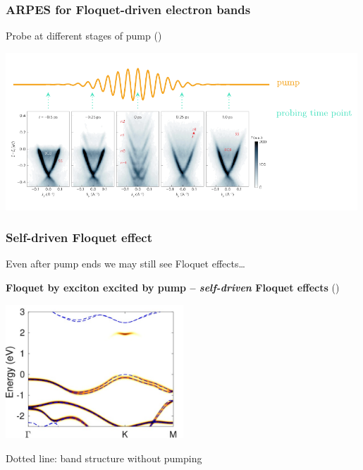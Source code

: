 \documentclass[t]{beamer}
\begin{document}
\begin{frame}
\frametitle{ARPES for Floquet-driven electron bands}

Probe at different stages of pump (\cite{mahmood2016selective})

\begin{center}
    \includegraphics[width=0.99\textwidth]{plot/floquet-pump-relation.pdf}    
\end{center}


\end{frame}

\begin{frame}
\frametitle{Self-driven Floquet effect}

Even after pump ends we may still see Floquet effects\dots

\textbf{Floquet by exciton excited by pump -- \emph{self-driven} Floquet effects} (\cite{chan2023})

\begin{center}
    \includegraphics[width=0.5\textwidth]{plot/self-driven-floquet.jpg}
\end{center}

Dotted line: band structure without pumping

\end{frame}
\end{document}
